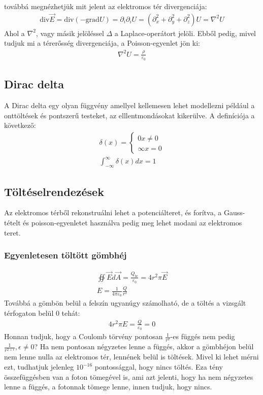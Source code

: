 \documentclass{article}
\begin{document}
továbbá megnézhetjük mit  jelent az elektromos tér divergenciája:
\begin{gather*}
\mathrm{div} \vec{E} = \mathrm{div}(-\mathrm{grad}U) = \partial_i \partial_i U = (\partial_x^2 + \partial_y^2 + \partial_z^2) U = \nabla^2 U
\end{gather*}
Ahol a $\nabla^2$, vagy másik jelöléssel $\Delta$ a Laplace-operátort jelöli. Ebből pedig, mivel tudjuk mi a térerősség divergenciája, a Poisson-egyenlet jön ki:
\begin{gather*}
\nabla^2 U = \frac{\rho}{\varepsilon_0}
\end{gather*}
\subsection{Dirac delta}
A Dirac delta egy olyan függvény amellyel kellemesen lehet modellezni például a onttöltések és pontszerű testeket, az elllentmondásokat kikerülve. A definíciója a következő:
\begin{gather*}
\delta(x) = \begin{cases} 
0  x\neq 0 \\
\infty  x=0
\end{cases} \\
\int_{-\infty}^{\infty} \delta(x) dx = 1
\end{gather*}
\subsection{Töltéselrendezések}
Az elektromos térből rekonstruálni lehet a potenciálteret, és forítva, a Gauss-tételt és poisson-egyenletet használva pedig meg lehet modani az elektromos teret.
\subsubsection{Egyenletesen töltött gömbhéj}
\begin{gather*}
\oiint \vec{E} d\vec{A} = \frac{Q_{be}}{\varepsilon_0} = 4r^2\pi\vec{E} \\
E = \frac{1}{4\pi\varepsilon_0} \frac{Q}{r^2}
\end{gather*}
Továbbá a gömbön belül a felszín ugyanúgy számolható, de a töltés a vizsgált térfogaton belül 0 tehát:
\begin{gather*}
4r^2\pi E = \frac{Q}{\varepsilon_0} = 0
\end{gather*}
Honnan tudjuk, hogy a Coulomb törvény pontosan $\frac{1}{r^2}$-es függés nem pedig $\frac{1}{r^{2+\epsilon}}, \epsilon\neq 0$? Ha nem pontosan négyzetes lenne a függés, akkor a gömbhéjon belül nem lenne nulla az elektromos tér, lennének belül is töltések. Mivel ki lehet mérni ezt, tudhatjuk jelenleg $10^{-16}$ pontossággal, hogy nincs töltés. Eza tény összefüggésben van a foton tömegével is, ami azt jelenti, hogy ha nem négyzetes lenne a függés, a fotonnak tömege lenne, innen tudjuk, hogy nincs.
\end{document}

